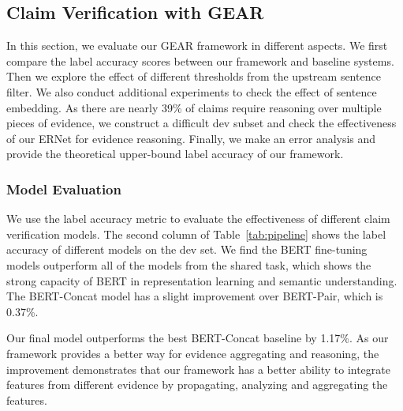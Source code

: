 \documentclass[11pt,a4paper]{article}
\begin{document}
\subsection{Claim Verification with GEAR}
In this section, we evaluate our GEAR framework in different aspects. We first compare the label accuracy scores between our framework and baseline systems. Then we explore the effect of different thresholds from the upstream sentence filter. We also conduct additional experiments to check the effect of sentence embedding.  As there are nearly 39\% of claims require reasoning over multiple pieces of evidence, we construct a difficult dev subset and check the effectiveness of our ERNet for evidence reasoning. Finally, we make an error analysis and provide the theoretical upper-bound label accuracy of our framework.

\subsubsection*{Model Evaluation}
We use the label accuracy metric to evaluate the effectiveness of different claim verification models.
The second column of Table~\ref{tab:pipeline} shows the label accuracy of different models on the dev set. We find the BERT fine-tuning models outperform all of the models from the shared task, which shows the strong capacity of BERT in representation learning and semantic understanding. The BERT-Concat model has a slight improvement over BERT-Pair, which is 0.37\%.

Our final model outperforms the best BERT-Concat baseline by 1.17\%. As our framework provides a better way for evidence aggregating and reasoning, the improvement demonstrates that our framework has a better ability to integrate features from different evidence by propagating, analyzing and aggregating the features. 

\begin{table}[t]
\begin{center}
\end{center}
\caption{\label{tab:difficult} Label accuracy on the difficult dev set with different ERNet layers and evidence aggregators (\%).}
\end{table}
\end{document}
